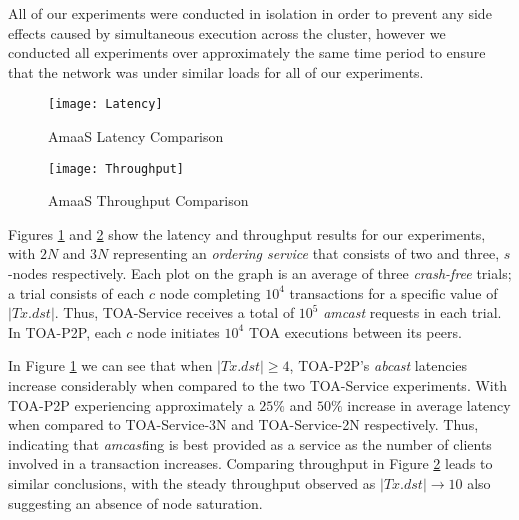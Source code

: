 	All of our experiments were conducted in isolation in order to prevent any side effects caused by simultaneous execution across the cluster, however we conducted all experiments over approximately the same time period to ensure that the network was under similar loads for all of our experiments. 
	
	\begin{figure}[htbp!]
	 \texttt{[image: Latency]}
	 \caption{AmaaS Latency Comparison}
	 \label{fig:LatencyGraph}
	\end{figure}
	
	\begin{figure}[htbp!]
	 \texttt{[image: Throughput]}
	 \caption{AmaaS Throughput Comparison}
	 \label{fig:ThroughputGraph}
	\end{figure}
	
	Figures \ref{fig:LatencyGraph} and \ref{fig:ThroughputGraph} show the latency and throughput results for our experiments, with $2N$ and $3N$ representing an \emph{ordering service} that consists of two and three, $s$-nodes respectively.  Each plot on the graph is an average of three \emph{crash-free} trials; a trial consists of each $c$ node completing $10^4$ transactions for a specific value of $|Tx.dst|$. Thus, TOA-Service receives a total of $10^5$ \emph{amcast} requests in each trial. In TOA-P2P, each $c$ node initiates $10^4$ TOA executions between its peers.  
	
	In Figure \ref{fig:LatencyGraph} we can see that when $|Tx.dst| \geq 4$, TOA-P2P's \emph{abcast} latencies increase considerably when compared to the two TOA-Service experiments.  With TOA-P2P experiencing approximately a $25\%$ and $50\%$ increase in average latency when compared to TOA-Service-3N and TOA-Service-2N respectively.  Thus, indicating that \emph{amcast}ing is best provided as a service as the number of clients involved in a transaction increases. Comparing throughput in Figure \ref{fig:ThroughputGraph} leads to similar conclusions, with the steady throughput observed as $|Tx.dst| \rightarrow 10$ also suggesting an absence of node saturation.  
	
